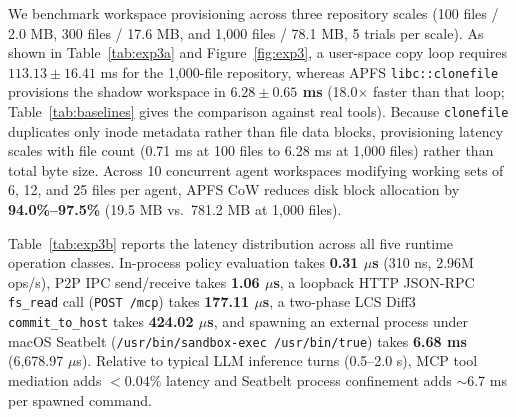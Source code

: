 \documentclass[10pt,twocolumn]{article}
\begin{document}
We benchmark workspace provisioning across three repository scales (100 files / 2.0 MB, 300 files / 17.6 MB, and 1,000 files / 78.1 MB, 5 trials per scale). As shown in Table~\ref{tab:exp3a} and Figure~\ref{fig:exp3}, a user-space copy loop requires $113.13 \pm 16.41$ ms for the 1,000-file repository, whereas APFS \texttt{libc::clonefile} provisions the shadow workspace in \textbf{$6.28 \pm 0.65$ ms} (18.0$\times$ faster than that loop; Table~\ref{tab:baselines} gives the comparison against real tools). Because \texttt{clonefile} duplicates only inode metadata rather than file data blocks, provisioning latency scales with file count (0.71 ms at 100 files to 6.28 ms at 1,000 files) rather than total byte size. Across 10 concurrent agent workspaces modifying working sets of 6, 12, and 25 files per agent, APFS CoW reduces disk block allocation by \textbf{94.0\%--97.5\%} (19.5 MB vs.\ 781.2 MB at 1,000 files).

Table~\ref{tab:exp3b} reports the latency distribution across all five runtime operation classes. In-process policy evaluation takes \textbf{0.31 $\mu$s} (310 ns, 2.96M ops/s), P2P IPC send/receive takes \textbf{1.06 $\mu$s}, a loopback HTTP JSON-RPC \texttt{fs\_read} call (\texttt{POST /mcp}) takes \textbf{177.11 $\mu$s}, a two-phase LCS Diff3 \texttt{commit\_to\_host} takes \textbf{424.02 $\mu$s}, and spawning an external process under macOS Seatbelt (\texttt{/usr/bin/sandbox-exec /usr/bin/true}) takes \textbf{6.68 ms} (6,678.97 $\mu$s). Relative to typical LLM inference turns (0.5--2.0 s), MCP tool mediation adds $<0.04\%$ latency and Seatbelt process confinement adds $\sim$6.7 ms per spawned command.
\end{document}
